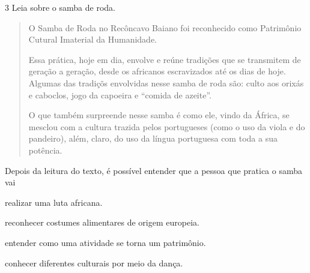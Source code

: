\num{3} Leia sobre o samba de roda.
\begin{quote}
O Samba de Roda no Recôncavo Baiano foi reconhecido como Patrimônio Cutural Imaterial da Humanidade.

Essa prática, hoje em dia, envolve e reúne tradições que se transmitem de geração a geração, desde os africanos escravizados até os dias de hoje. Algumas das tradiçõs envolvidas nesse samba de roda são: culto aos orixás e caboclos, jogo da capoeira e “comida de azeite”.

O que também surpreende nesse samba é como ele, vindo da África, se mesclou com a cultura trazida pelos portugueses (como o uso da viola e do pandeiro), além, claro, do uso da língua portuguesa com toda a sua potência.


\end{quote}

\noindent{}Depois da leitura do texto, é possível entender que a pessoa que pratica o samba vai

\begin{escolha}
\item realizar uma luta africana.

\item reconhecer costumes alimentares de origem europeia.

\item entender como uma atividade se torna um patrimônio.

\item conhecer diferentes culturais por meio da dança.
\end{escolha}



